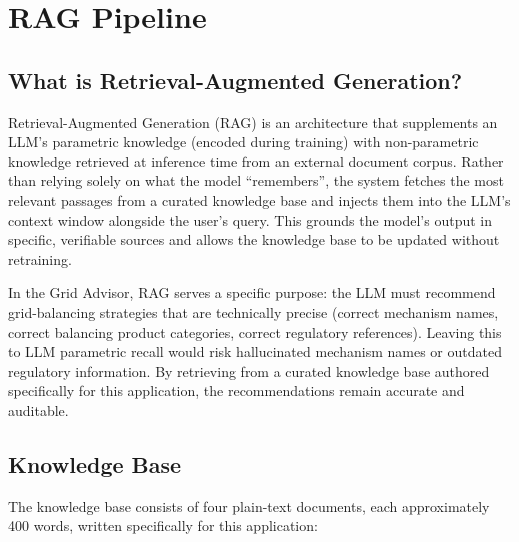 \documentclass[12pt, a4paper]{article}
\begin{document}
\clearpage
\section{RAG Pipeline}
\label{sec:rag}

\subsection{What is Retrieval-Augmented Generation?}

Retrieval-Augmented Generation (RAG) is an architecture that supplements an LLM's parametric knowledge (encoded during training) with non-parametric knowledge retrieved at inference time from an external document corpus. Rather than relying solely on what the model ``remembers'', the system fetches the most relevant passages from a curated knowledge base and injects them into the LLM's context window alongside the user's query. This grounds the model's output in specific, verifiable sources and allows the knowledge base to be updated without retraining.

In the Grid Advisor, RAG serves a specific purpose: the LLM must recommend grid-balancing strategies that are technically precise (correct mechanism names, correct balancing product categories, correct regulatory references). Leaving this to LLM parametric recall would risk hallucinated mechanism names or outdated regulatory information. By retrieving from a curated knowledge base authored specifically for this application, the recommendations remain accurate and auditable.

\subsection{Knowledge Base}

The knowledge base consists of four plain-text documents, each approximately 400 words, written specifically for this application:
\end{document}
